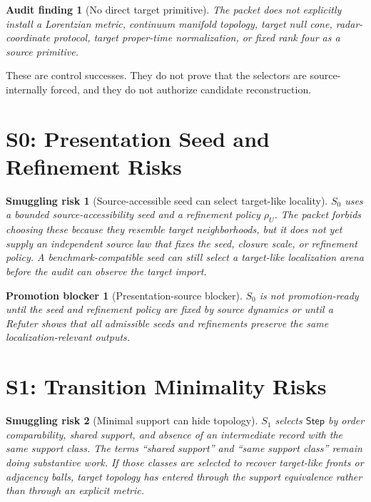 \documentclass[11pt]{article}
\newcommand{\Step}{\mathsf{Step}}
\newtheorem{auditfinding}{Audit finding}
\newtheorem{smugglingrisk}{Smuggling risk}
\newtheorem{promotionblocker}{Promotion blocker}
\begin{document}
\begin{auditfinding}[No direct target primitive]
The packet does not explicitly install a Lorentzian metric, continuum
manifold topology, target null cone, radar-coordinate protocol, target
proper-time normalization, or fixed rank four as a source primitive.
\end{auditfinding}

These are control successes. They do not prove that the selectors are
source-internally forced, and they do not authorize candidate reconstruction.

\section{S0: Presentation Seed and Refinement Risks}

\begin{smugglingrisk}[Source-accessible seed can select target-like locality]
\(S_0\) uses a bounded source-accessibility seed and a refinement policy
\(\rho_U\). The packet forbids choosing these because they resemble target
neighborhoods, but it does not yet supply an independent source law that
fixes the seed, closure scale, or refinement policy. A benchmark-compatible
seed can still select a target-like localization arena before the audit can
observe the target import.
\end{smugglingrisk}

\begin{promotionblocker}[Presentation-source blocker]
\(S_0\) is not promotion-ready until the seed and refinement policy are fixed
by source dynamics or until a Refuter shows that all admissible seeds and
refinements preserve the same localization-relevant outputs.
\end{promotionblocker}

\section{S1: Transition Minimality Risks}

\begin{smugglingrisk}[Minimal support can hide topology]
\(S_1\) selects \(\Step\) by order comparability, shared support, and absence
of an intermediate record with the same support class. The terms
``shared support'' and ``same support class'' remain doing substantive work.
If those classes are selected to recover target-like fronts or adjacency
balls, target topology has entered through the support equivalence rather than
through an explicit metric.
\end{smugglingrisk}
\end{document}
